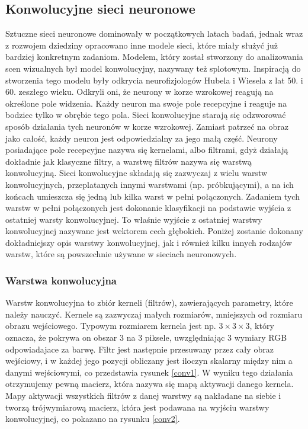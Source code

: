 \documentclass[a4paper,twoside,12pt]{book}
\begin{document}
{\subsection{Konwolucyjne sieci neuronowe}{Sztuczne sieci neuronowe dominowały w początkowych latach badań, jednak wraz z rozwojem dziedziny opracowano inne modele sieci, które miały służyć już bardziej konkretnym zadaniom. Modelem, który został stworzony do analizowania scen wizualnych był model konwolucyjny, nazywany też splotowym. }
{Inspiracją do stworzenia tego modelu były odkrycia neurofizjologów Hubela i Wiesela z lat 50. i 60. zeszłego wieku. \cite{hubel1959receptive,hubel1963shape,hubel1968receptive} Odkryli oni, że neurony w korze wzrokowej reagują na określone pole widzenia. Każdy neuron ma swoje pole recepcyjne i reaguje na bodziec tylko w obrębie tego pola. Sieci konwolucyjne starają się odzworować sposób działania tych neuronów w korze wzrokowej. Zamiast patrzeć na obraz jako całość, każdy neuron jest odpowiedzialny za jego małą część. Neurony posiadające pole recepcyjne nazywa się kernelami, albo filtrami, gdyż działają dokładnie jak klasyczne filtry, a warstwę filtrów nazywa się warstwą konwolucyjną. Sieci konwolucyjne składają się zazwyczaj z wielu warstw konwolucyjnych, przeplatanych innymi warstwami (np. próbkującymi), a na ich końcach umieszcza się jedną lub kilka warst w pełni połączonych. Zadaniem tych warstw w pełni połączonych jest dokonanie klasyfikacji na podstawie wyjścia z ostatniej warsty konwolucyjnej. To właśnie wyjście z ostatniej warstwy konwolucyjnej nazywane jest wektorem cech głębokich. Poniżej zostanie dokonany dokładniejszy opis warstwy konwolucyjnej, jak i również kilku innych rodzajów warstw, które są powszechnie używane w sieciach neuronowych.}

\subsubsection{Warstwa konwolucyjna}
{Warstw konwolucyjna to zbiór kerneli (filtrów), zawierających parametry, które należy nauczyć. Kernele są zazwyczaj małych rozmiarów, mniejszych od rozmiaru obrazu wejściowego. Typowym rozmiarem kernela jest np. $3 \times 3 \times3$, który oznacza, że pokrywa on obszar 3 na 3 piksele, uwzględniając 3 wymiary RGB odpowiadajace za barwę. Filtr jest następnie przesuwany przez cały obraz wejściowy, i w każdej jego pozycji obliczany jest iloczyn skalarny między nim a danymi wejściowymi, co przedstawia rysunek \ref{conv1}. W wyniku tego działania otrzymujemy pewną macierz, która nazywa się mapą aktywacji danego kernela. Mapy aktywacji wszystkich filtrów z danej warstwy są nakładane na siebie i tworzą trójwymiarową macierz, która jest podawana na wyjściu warstwy konwolucyjnej, co pokazano na rysunku \ref{conv2}.}

}
\end{document}
